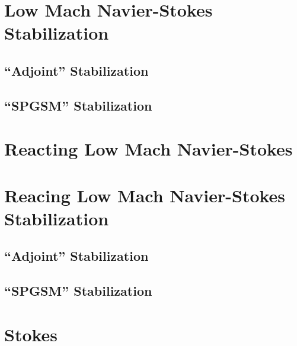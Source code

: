 \documentclass[twoside]{report}
\begin{document}
\chapter{Low Mach Navier-Stokes Stabilization}
\section{``Adjoint'' Stabilization}
\section{``SPGSM'' Stabilization}

\chapter{Reacting Low Mach Navier-Stokes}

\chapter{Reacing Low Mach Navier-Stokes Stabilization}
\section{``Adjoint'' Stabilization}
\section{``SPGSM'' Stabilization}

\chapter{Stokes}




\end{document}
